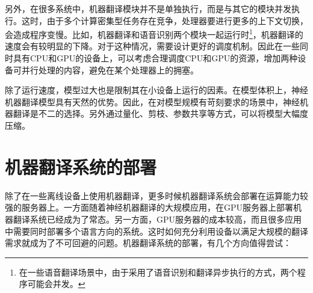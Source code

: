 \parinterval 另外，在很多系统中，机器翻译模块并不是单独执行，而是与其它的模块并发执行。这时，由于多个计算密集型任务存在竞争，处理器要进行更多的上下文切换，会造成程序变慢。比如，机器翻译和语音识别两个模块一起运行时{\footnote{在一些语音翻译场景中，由于采用了语音识别和翻译异步执行的方式，两个程序可能会并发。}}，机器翻译的速度会有较明显的下降。对于这种情况，需要设计更好的调度机制。因此在一些同时具有CPU和GPU的设备上，可以考虑合理调度CPU和GPU的资源，增加两种设备可并行处理的内容，避免在某个处理器上的拥塞。

\parinterval 除了运行速度，模型过大也是限制其在小设备上运行的因素。在模型体积上，神经机器翻译模型具有天然的优势。因此，在对模型规模有苛刻要求的场景中，神经机器翻译是不二的选择。另外通过量化、剪枝、参数共享等方式，可以将模型大幅度压缩。


\section{机器翻译系统的部署}

\parinterval 除了在一些离线设备上使用机器翻译，更多时候机器翻译系统会部署在运算能力较强的服务器上。一方面随着神经机器翻译的大规模应用，在GPU服务器上部署机器翻译系统已经成为了常态。另一方面，GPU服务器的成本较高，而且很多应用中需要同时部署多个语言方向的系统。这时如何充分利用设备以满足大规模的翻译需求就成为了不可回避的问题。机器翻译系统的部署，有几个方向值得尝试：

